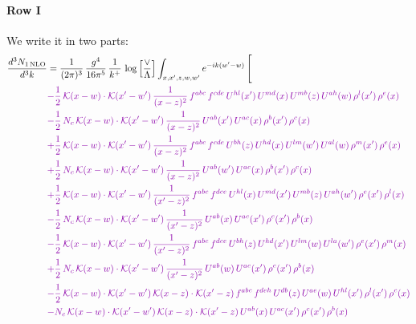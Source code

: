 \documentclass[10pt]{article}
\numberwithin{equation}{section}
\begin{document}
\paragraph{Row I}
We write it in two parts: 
\begin{align}
\frac{d^{3}N_{1\,\mathrm{NLO}}}{d^{3}k} & = \frac{1}{(2\pi)^{3}}\,\frac{g^{4}}{16\pi^{5}}\,\frac{1}{k^{+}}\,\log\Big[\frac{\vee}{\Lambda}\Big]\int_{x,x',z,w,w'}e^{-ik(w'-w)}\,\Bigg[\notag\\ &{\color{CC} -\frac{1}{2}\,\mathcal{K}(x-w)\cdot\mathcal{K}(x'-w')\,\frac{1}{(x-z)^{2}}\,f^{abc}\,f^{cde}\,U^{hl}(x')\,U^{md}(x)\,U^{mb}(z)\,U^{ah}(w)\,\rho^{l}(x')\,\rho^{e}(x)} \notag\\
&{\color{CC} -\frac{1}{2}\,N_{c}\,\mathcal{K}(x-w)\cdot\mathcal{K}(x'-w')\,\frac{1}{(x-z)^{2}}\,U^{ab}(x')\,U^{ac}(x)\,\rho^{b}(x')\,\rho^{c}(x)} \notag\\
&{\color{CC} +\frac{1}{2}\,\mathcal{K}(x-w)\cdot\mathcal{K}(x'-w')\,\frac{1}{(x-z)^{2}}\,f^{abc}\,f^{cde}\,U^{bh}(z)\,U^{hd}(x)\,U^{lm}(w')\,U^{al}(w)\,\rho^{m}(x')\,\rho^{e}(x)} \notag\\
&{\color{CC} +\frac{1}{2}\,N_{c}\,\mathcal{K}(x-w)\cdot\mathcal{K}(x'-w')\,\frac{1}{(x-z)^{2}}\,U^{ab}(w')\,U^{ac}(x)\,\rho^{b}(x')\,\rho^{c}(x)} \notag\\
&{\color{CC} +\frac{1}{2}\,\mathcal{K}(x-w)\cdot\mathcal{K}(x'-w')\,\frac{1}{(x'-z)^{2}}\,f^{abc}\,f^{dce}\,U^{hl}(x)\,U^{md}(x')\,U^{mb}(z)\,U^{ah}(w')\,\rho^{e}(x')\,\rho^{l}(x)} \notag\\
&{\color{CC} -\frac{1}{2}\,N_{c}\,\mathcal{K}(x-w)\cdot\mathcal{K}(x'-w')\,\frac{1}{(x'-z)^{2}}\,U^{ab}(x)\,U^{ac}(x')\,\rho^{c}(x')\,\rho^{b}(x)} \notag\\
&{\color{CC} -\frac{1}{2}\,\mathcal{K}(x-w)\cdot\mathcal{K}(x'-w')\,\frac{1}{(x'-z)^{2}}\,f^{abc}\,f^{dce}\,U^{bh}(z)\,U^{hd}(x')\,U^{lm}(w)\,U^{la}(w')\,\rho^{e}(x')\,\rho^{m}(x)} \notag\\
&{\color{CC} +\frac{1}{2}\,N_{c}\,\mathcal{K}(x-w)\cdot\mathcal{K}(x'-w')\,\frac{1}{(x'-z)^{2}}\,U^{ab}(w)\,U^{ac}(x')\,\rho^{c}(x')\,\rho^{b}(x)} \notag\\
&{\color{CC} -\frac{1}{2}\,\mathcal{K}(x-w)\cdot\mathcal{K}(x'-w')\,\mathcal{K}(x-z)\cdot\mathcal{K}(x'-z)\,f^{abc}\,f^{deh}\,U^{db}(z)\,U^{ae}(w)\,U^{hl}(x')\,\rho^{l}(x')\,\rho^{c}(x)} \notag\\
&{\color{CC} -N_{c}\,\mathcal{K}(x-w)\cdot\mathcal{K}(x'-w')\,\mathcal{K}(x-z)\cdot\mathcal{K}(x'-z)\,U^{ab}(x)\,U^{ac}(x')\,\rho^{c}(x')\,\rho^{b}(x)} \notag\\

\end{align}
\end{document}
